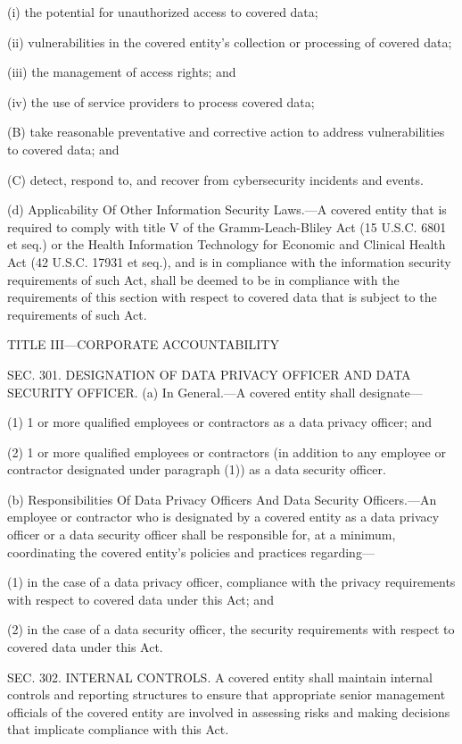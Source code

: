 (i) the potential for unauthorized access to covered data;

(ii) vulnerabilities in the covered entity’s collection or processing of covered data;

(iii) the management of access rights; and

(iv) the use of service providers to process covered data;

(B) take reasonable preventative and corrective action to address vulnerabilities to covered data; and

(C) detect, respond to, and recover from cybersecurity incidents and events.

(d) Applicability Of Other Information Security Laws.—A covered entity that is required to comply with title V of the Gramm-Leach-Bliley Act (15 U.S.C. 6801 et seq.) or the Health Information Technology for Economic and Clinical Health Act (42 U.S.C. 17931 et seq.), and is in compliance with the information security requirements of such Act, shall be deemed to be in compliance with the requirements of this section with respect to covered data that is subject to the requirements of such Act.

TITLE III—CORPORATE ACCOUNTABILITY

SEC. 301. DESIGNATION OF DATA PRIVACY OFFICER AND DATA SECURITY OFFICER.
(a) In General.—A covered entity shall designate—

(1) 1 or more qualified employees or contractors as a data privacy officer; and

(2) 1 or more qualified employees or contractors (in addition to any employee or contractor designated under paragraph (1)) as a data security officer.

(b) Responsibilities Of Data Privacy Officers And Data Security Officers.—An employee or contractor who is designated by a covered entity as a data privacy officer or a data security officer shall be responsible for, at a minimum, coordinating the covered entity's policies and practices regarding—

(1) in the case of a data privacy officer, compliance with the privacy requirements with respect to covered data under this Act; and

(2) in the case of a data security officer, the security requirements with respect to covered data under this Act.


SEC. 302. INTERNAL CONTROLS.
A covered entity shall maintain internal controls and reporting structures to ensure that appropriate senior management officials of the covered entity are involved in assessing risks and making decisions that implicate compliance with this Act.



